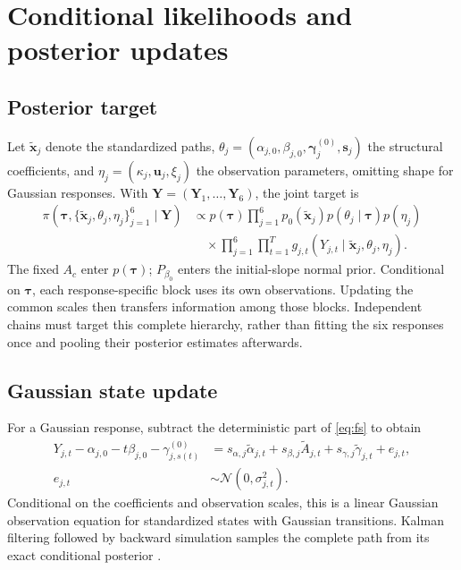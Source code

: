 \documentclass[11pt,a4paper]{article}
\newcommand{\N}{\mathcal N}
\begin{document}
\FloatBarrier

	\section{Conditional likelihoods and posterior updates}
	\label{supp:computation}
	
	\subsection{Posterior target}

Let \(\widetilde{\bm x}_j\) denote the standardized paths,
\(\theta_j=(\alpha_{j,0},\beta_{j,0},\bm\gamma^{(0)}_j,\bm s_j)\)
the structural coefficients, and \(\eta_j=(\kappa_j,\bm u_j,\xi_j)\)
the observation parameters, omitting shape for Gaussian responses.
With \(\bm Y=(\bm Y_1,\ldots,\bm Y_6)\), the joint target is
\begin{equation}\label{eq:supp-posterior-target}
\begin{aligned}
\pi(\bm\tau,\{\widetilde{\bm x}_j,\theta_j,\eta_j\}_{j=1}^{6}\mid\bm Y)
&\propto p(\bm\tau)\prod_{j=1}^{6}
 p_0(\widetilde{\bm x}_j)p(\theta_j\mid\bm\tau)p(\eta_j)\\[-1mm]
&\quad{}\times\prod_{j=1}^{6}\prod_{t=1}^{T}
 g_{j,t}(Y_{j,t}\mid\widetilde{\bm x}_j,\theta_j,\eta_j).
\end{aligned}
\end{equation}
The fixed \(A_c\) enter \(p(\bm\tau)\); \(P_{\beta_0}\) enters
the initial-slope normal prior. Conditional on \(\bm\tau\), each
response-specific block uses its own observations. Updating the common
scales then transfers information among those blocks. Independent
chains must target this complete hierarchy, rather than fitting the six
responses once and pooling their posterior estimates afterwards.

	\subsection{Gaussian state update}
	
	For a Gaussian response, subtract the deterministic part of
	\cref{eq:fs} to obtain
	\begin{equation}\label{eq:supp-gaussian-state-update}
		\begin{aligned}
			Y_{j,t}-\alpha_{j,0}-t\beta_{j,0}-\gamma^{(0)}_{j,s(t)}
			&=s_{\alpha,j}\widetilde\alpha_{j,t}
			+s_{\beta,j}\widetilde A_{j,t}
			+s_{\gamma,j}\widetilde\gamma_{j,t}+e_{j,t},\\
			e_{j,t}&\sim\N(0,\sigma_{j,t}^2).
		\end{aligned}
	\end{equation}
	Conditional on the coefficients and observation scales, this is a linear
	Gaussian observation equation for standardized states with Gaussian
	transitions. Kalman filtering followed by backward simulation samples the
	complete path from its exact conditional posterior
	\citep{carter1994,fruhwirthschnatter1994,durbin2000}.
	
\end{document}
